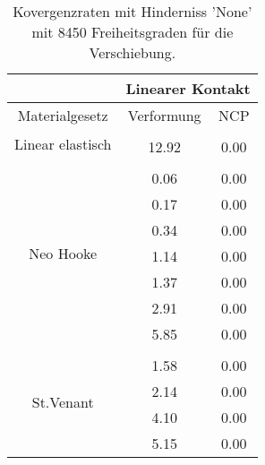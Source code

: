 \begin{table} 
\centering 
\begin{tabular}{c|cc|} 
\cline{2-3} 
 & \multicolumn{2}{|c|}{Linearer Kontakt} \\ 
\hline 
\multicolumn{1}{|c|}{Materialgesetz} & \multicolumn{1}{c|}{Verformung} & \multicolumn{1}{c|}{NCP} \\ 
\hline 
\multicolumn{1}{|c|}{\multirow{2}{*}{Linear elastisch}} &\multicolumn{1}{|c|}{} & \multicolumn{1}{|c|}{} \\ 
\multicolumn{1}{|c|}{} & \multicolumn{1}{|c|}{     12.92} & \multicolumn{1}{|c|}{      0.00} \\ 
\hline 
\multicolumn{1}{|c|}{\multirow{8}{*}{Neo Hooke}} &\multicolumn{1}{|c|}{} & \multicolumn{1}{|c|}{} \\ 
\multicolumn{1}{|c|}{} & \multicolumn{1}{|c|}{      0.06} & \multicolumn{1}{|c|}{      0.00} \\ 
\multicolumn{1}{|c|}{} & \multicolumn{1}{|c|}{      0.17} & \multicolumn{1}{|c|}{      0.00} \\ 
\multicolumn{1}{|c|}{} & \multicolumn{1}{|c|}{      0.34} & \multicolumn{1}{|c|}{      0.00} \\ 
\multicolumn{1}{|c|}{} & \multicolumn{1}{|c|}{      1.14} & \multicolumn{1}{|c|}{      0.00} \\ 
\multicolumn{1}{|c|}{} & \multicolumn{1}{|c|}{      1.37} & \multicolumn{1}{|c|}{      0.00} \\ 
\multicolumn{1}{|c|}{} & \multicolumn{1}{|c|}{      2.91} & \multicolumn{1}{|c|}{      0.00} \\ 
\multicolumn{1}{|c|}{} & \multicolumn{1}{|c|}{      5.85} & \multicolumn{1}{|c|}{      0.00} \\ 
\hline 
\multicolumn{1}{|c|}{\multirow{5}{*}{St.Venant}} &\multicolumn{1}{|c|}{} & \multicolumn{1}{|c|}{} \\ 
\multicolumn{1}{|c|}{} & \multicolumn{1}{|c|}{      1.58} & \multicolumn{1}{|c|}{      0.00} \\ 
\multicolumn{1}{|c|}{} & \multicolumn{1}{|c|}{      2.14} & \multicolumn{1}{|c|}{      0.00} \\ 
\multicolumn{1}{|c|}{} & \multicolumn{1}{|c|}{      4.10} & \multicolumn{1}{|c|}{      0.00} \\ 
\multicolumn{1}{|c|}{} & \multicolumn{1}{|c|}{      5.15} & \multicolumn{1}{|c|}{      0.00} \\ 
\hline 
\end{tabular}\caption{Kovergenzraten mit Hinderniss 'None' mit 8450 Freiheitsgraden für die Verschiebung.}\label{tab:Rate_None_level5}
\end{table} 

